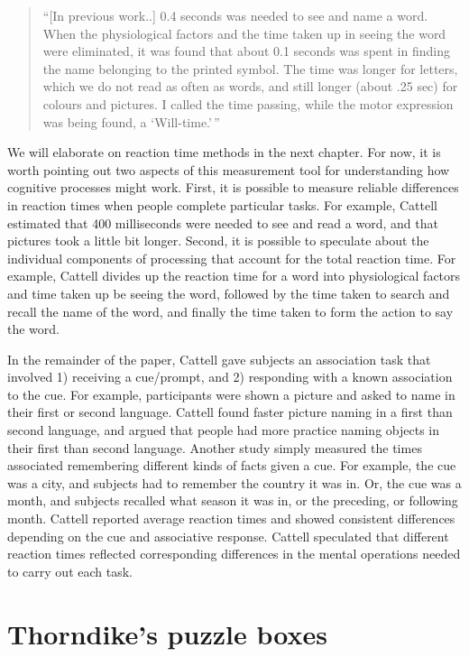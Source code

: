 \documentclass[
  oneside,
  12pt]{crumpbook}
\begin{document}
\begin{quote}
``{[}In previous work..{]} 0.4 seconds was needed to see and name a word. When the physiological factors and the time taken up in seeing the word were eliminated, it was found that about 0.1 seconds was spent in finding the name belonging to the printed symbol. The time was longer for letters, which we do not read as often as words, and still longer (about .25 sec) for colours and pictures. I called the time passing, while the motor expression was being found, a `Will-time.'\,''
\end{quote}

We will elaborate on reaction time methods in the next chapter. For now, it is worth pointing out two aspects of this measurement tool for understanding how cognitive processes might work. First, it is possible to measure reliable differences in reaction times when people complete particular tasks. For example, Cattell estimated that 400 milliseconds were needed to see and read a word, and that pictures took a little bit longer. Second, it is possible to speculate about the individual components of processing that account for the total reaction time. For example, Cattell divides up the reaction time for a word into physiological factors and time taken up be seeing the word, followed by the time taken to search and recall the name of the word, and finally the time taken to form the action to say the word.

In the remainder of the paper, Cattell gave subjects an association task that involved 1) receiving a cue/prompt, and 2) responding with a known association to the cue. For example, participants were shown a picture and asked to name in their first or second language. Cattell found faster picture naming in a first than second language, and argued that people had more practice naming objects in their first than second language. Another study simply measured the times associated remembering different kinds of facts given a cue. For example, the cue was a city, and subjects had to remember the country it was in. Or, the cue was a month, and subjects recalled what season it was in, or the preceding, or following month. Cattell reported average reaction times and showed consistent differences depending on the cue and associative response. Cattell speculated that different reaction times reflected corresponding differences in the mental operations needed to carry out each task.

\hypertarget{thorndikes-puzzle-boxes}{%
\section{Thorndike's puzzle boxes}\label{thorndikes-puzzle-boxes}}
\end{document}
